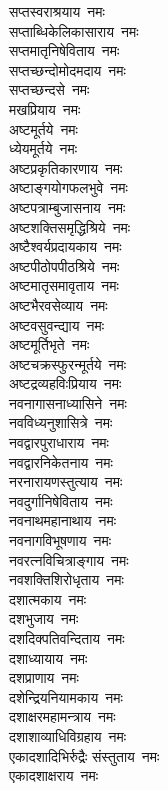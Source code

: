 \begin{multicols}{2}
\begin{flushleft}
सप्तस्वराश्रयाय~नमः\\
सप्ताब्धिकेलिकासाराय~नमः\\
सप्तमातृनिषेविताय~नमः\\
सप्तच्छन्दोमोदमदाय~नमः\\
सप्तच्छन्दसे~नमः\\
मखप्रियाय~नमः\\
अष्टमूर्तये~नमः\\
ध्येयमूर्तये~नमः\\
अष्टप्रकृतिकारणाय~नमः\hfill{}\\
अष्टाङ्गयोगफलभुवे~नमः\\
अष्टपत्राम्बुजासनाय~नमः\\
अष्टशक्तिसमृद्धिश्रिये~नमः\\
अष्टैश्वर्यप्रदायकाय~नमः\\
अष्टपीठोपपीठश्रिये~नमः\\
अष्टमातृसमावृताय~नमः\\
अष्टभैरवसेव्याय~नमः\\
अष्टवसुवन्द्याय~नमः\\
अष्टमूर्तिभृते~नमः\\
अष्टचक्रस्फुरन्मूर्तये~नमः\hfill{}\\
अष्टद्रव्यहविःप्रियाय~नमः\\
नवनागासनाध्यासिने~नमः\\
नवविध्यनुशासित्रे~नमः\\
नवद्वारपुराधाराय~नमः\\
नवद्वारनिकेतनाय~नमः\\
नरनारायणस्तुत्याय~नमः\\
नवदुर्गानिषेविताय~नमः\\
नवनाथमहानाथाय~नमः\\
नवनागविभूषणाय~नमः\\
नवरत्नविचित्राङ्गाय~नमः\hfill{}\\
नवशक्तिशिरोधृताय~नमः\\
दशात्मकाय~नमः\\
दशभुजाय~नमः\\
दशदिक्पतिवन्दिताय~नमः\\
दशाध्यायाय~नमः\\
दशप्राणाय~नमः\\
दशेन्द्रियनियामकाय~नमः\\
दशाक्षरमहामन्त्राय~नमः\\
दशाशाव्याधिविग्रहाय~नमः\\
एकादशादिभिर्रुद्रैः संस्तुताय~नमः\hfill{}\\
एकादशाक्षराय~नमः\\

\end{flushleft}
\end{multicols}
